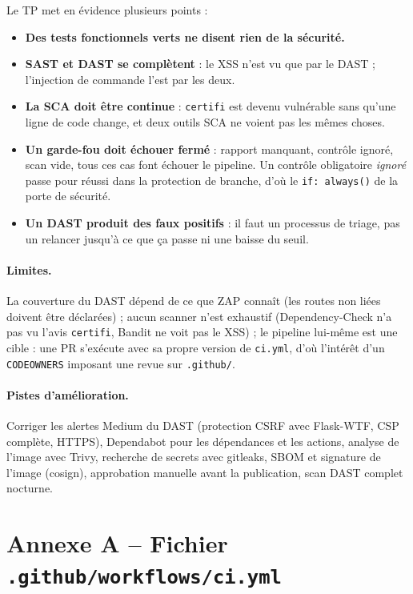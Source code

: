 \documentclass[11pt,a4paper]{article}
\newcommand{\code}[1]{\texttt{#1}}
\begin{document}
Le TP met en évidence plusieurs points :
\begin{itemize}
  \item \textbf{Des tests fonctionnels verts ne disent rien de la sécurité.}
  \item \textbf{SAST et DAST se complètent} : le XSS n'est vu que par le DAST ; l'injection de commande
        l'est par les deux.
  \item \textbf{La SCA doit être continue} : \code{certifi} est devenu vulnérable sans qu'une ligne de
        code change, et deux outils SCA ne voient pas les mêmes choses.
  \item \textbf{Un garde-fou doit échouer fermé} : rapport manquant, contrôle ignoré, scan vide, tous
        ces cas font échouer le pipeline. Un contrôle obligatoire \emph{ignoré} passe pour réussi dans
        la protection de branche, d'où le \code{if: always()} de la porte de sécurité.
  \item \textbf{Un DAST produit des faux positifs} : il faut un processus de triage, pas un
        \og relancer jusqu'à ce que ça passe \fg{} ni une baisse du seuil.
\end{itemize}

\paragraph{Limites.} La couverture du DAST dépend de ce que ZAP connaît (les routes non liées doivent
être déclarées) ; aucun scanner n'est exhaustif (Dependency-Check n'a pas vu l'avis \code{certifi}, Bandit
ne voit pas le XSS) ; le pipeline lui-même est une cible : une PR s'exécute avec sa propre version de
\code{ci.yml}, d'où l'intérêt d'un \code{CODEOWNERS} imposant une revue sur \code{.github/}.

\paragraph{Pistes d'amélioration.} Corriger les alertes Medium du DAST (protection CSRF avec
Flask-WTF, CSP complète, HTTPS), Dependabot pour les dépendances et les actions, analyse de l'image avec
Trivy, recherche de secrets avec gitleaks, SBOM et signature de l'image (cosign), approbation manuelle
avant la publication, scan DAST complet nocturne.

\bigskip
\section*{Annexe A -- Fichier \texttt{.github/workflows/ci.yml}}\label{sec:ci}

\end{document}
